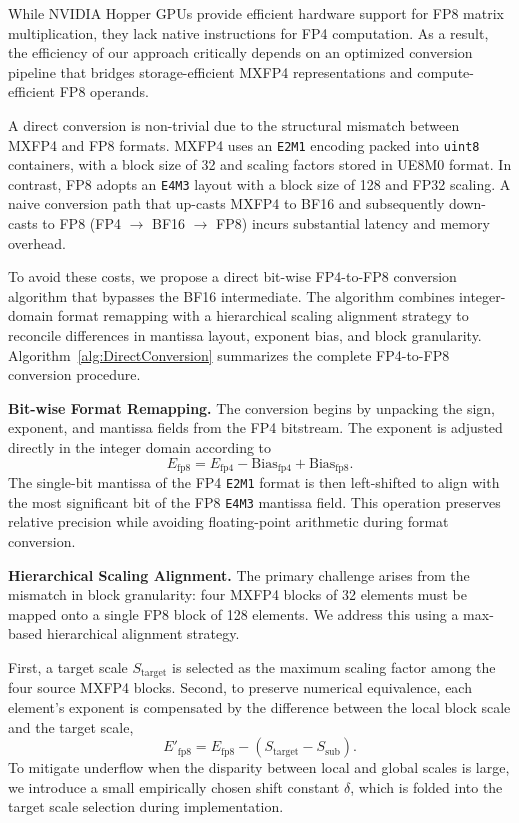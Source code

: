 While NVIDIA Hopper GPUs provide efficient hardware support for FP8 matrix multiplication, they lack native instructions for FP4 computation. As a result, the efficiency of our approach critically depends on an optimized conversion pipeline that bridges storage-efficient MXFP4 representations and compute-efficient FP8 operands.

A direct conversion is non-trivial due to the structural mismatch between MXFP4 and FP8 formats. MXFP4 uses an \texttt{E2M1} encoding packed into \texttt{uint8} containers, with a block size of 32 and scaling factors stored in UE8M0 format. In contrast, FP8 adopts an \texttt{E4M3} layout with a block size of 128 and FP32 scaling. A naive conversion path that up-casts MXFP4 to BF16 and subsequently down-casts to FP8 (FP4 $\rightarrow$ BF16 $\rightarrow$ FP8) incurs substantial latency and memory overhead.

To avoid these costs, we propose a direct bit-wise FP4-to-FP8 conversion algorithm that bypasses the BF16 intermediate. The algorithm combines integer-domain format remapping with a hierarchical scaling alignment strategy to reconcile differences in mantissa layout, exponent bias, and block granularity. Algorithm~\ref{alg:DirectConversion} summarizes the complete FP4-to-FP8 conversion procedure.

\textbf{Bit-wise Format Remapping.}
The conversion begins by unpacking the sign, exponent, and mantissa fields from the FP4 bitstream. The exponent is adjusted directly in the integer domain according to
\[
E_{\text{fp8}} = E_{\text{fp4}} - \mathrm{Bias}_{\text{fp4}} + \mathrm{Bias}_{\text{fp8}}.
\]
The single-bit mantissa of the FP4 \texttt{E2M1} format is then left-shifted to align with the most significant bit of the FP8 \texttt{E4M3} mantissa field. This operation preserves relative precision while avoiding floating-point arithmetic during format conversion.

\textbf{Hierarchical Scaling Alignment.}
The primary challenge arises from the mismatch in block granularity: four MXFP4 blocks of 32 elements must be mapped onto a single FP8 block of 128 elements. We address this using a max-based hierarchical alignment strategy.

First, a target scale $S_{\text{target}}$ is selected as the maximum scaling factor among the four source MXFP4 blocks. Second, to preserve numerical equivalence, each element’s exponent is compensated by the difference between the local block scale and the target scale,
\[
E'_{\text{fp8}} = E_{\text{fp8}} - (S_{\text{target}} - S_{\text{sub}}).
\]
To mitigate underflow when the disparity between local and global scales is large, we introduce a small empirically chosen shift constant $\delta$, which is folded into the target scale selection during implementation.

